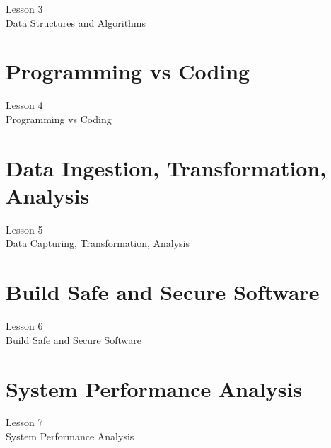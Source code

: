 \documentclass[aspectratio=1610]{beamer}
\begin{document}
\begin{frame}
\begin{center}
\Huge Lesson 3\\
Data Structures and Algorithms
\end{center}
\end{frame}




\section{Programming vs Coding}

\begin{frame}
\begin{center}
\Huge Lesson 4\\
Programming vs Coding
\end{center}
\end{frame}


\section{Data Ingestion, Transformation, Analysis}

\begin{frame}
\begin{center}
\Huge Lesson 5\\
Data Capturing, Transformation, Analysis
\end{center}
\end{frame}



\section{Build Safe and Secure Software}
\begin{frame}
\begin{center}
\Huge Lesson 6\\
Build Safe and Secure Software
\end{center}
\end{frame}


\section{System Performance Analysis}
\begin{frame}
\begin{center}
\Huge Lesson 7\\
System Performance Analysis
\end{center}
\end{frame}
\end{document}

